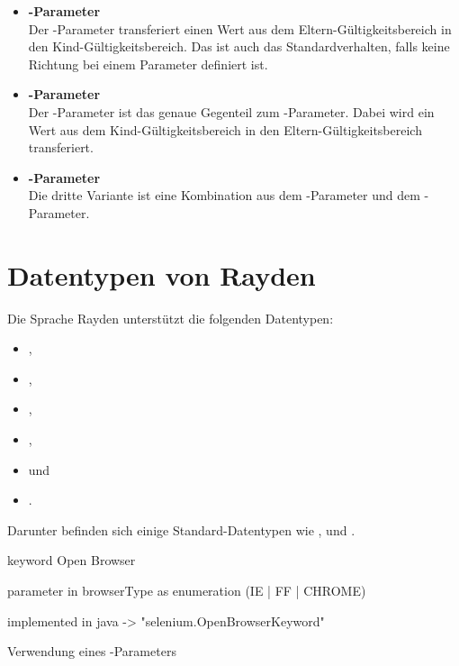 \begin{itemize}
\item \textbf{-Parameter}\\
Der -Parameter transferiert einen Wert aus dem Eltern-Gültigkeitsbereich in den Kind-Gültigkeitsbereich. Das ist auch das Standardverhalten, falls keine Richtung bei einem Parameter definiert ist.\\

\item \textbf{-Parameter}\\
Der -Parameter ist das genaue Gegenteil zum -Parameter. Dabei wird ein Wert aus dem Kind-Gültigkeitsbereich in den Eltern-Gültigkeitsbereich transferiert. \\

\item \textbf{-Parameter}\\
Die dritte Variante ist eine Kombination aus dem -Parameter und dem -Parameter.\\
\end{itemize}

\section{Datentypen von Rayden}

Die Sprache Rayden unterstützt die folgenden Datentypen:

\begin{itemize}
\item {},
\item {},
\item {},
\item {},
\item {} und
\item {}.
\end{itemize}

\SuperPar
Darunter befinden sich einige Standard-Datentypen wie ,  und . 

\begin{program}
\begin{JavaCode}
keyword Open Browser { 
	parameter in browserType as enumeration (IE | FF | CHROME)

	implemented in java -> "selenium.OpenBrowserKeyword"
}
\end{JavaCode}
\caption{Verwendung eines -Parameters}
\label{prog:enum}
\end{program}

